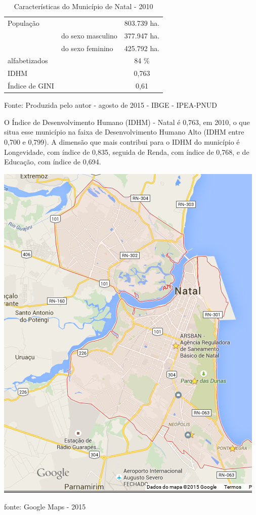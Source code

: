 \documentclass[
	12pt,				%
	openright,			%
	twoside,			%
	a4paper,			%
	chapter=TITLE,		%
	section=TITLE,		%
	subsection=TITLE,	%
	subsubsection=TITLE,%
	spanish,            %
	english,			%
	brazil				%
	]{abntex2}
\begin{document}
\begin{table}[h]
	\begin{center}
	\caption{Características do Município de Natal - 2010}%
	\label{Tabela 3}
	\begin{tabular}{llc}
		\hline		
		População & &803.739 ha. \\
		&do sexo masculino & 377.947 ha. \\
		&do sexo feminino & 425.792 ha. \\
		\hline
		alfabetizados & &84 \%\\
		IDHM & &0,763 \\
		Índice de GINI & &0,61 \\
		\hline
	\end{tabular}
	\end{center}
	\ABNTEXchapterfont\small{Fonte: Produzida pelo autor - agosto de 2015 - IBGE\cite{IBGE} - IPEA-PNUD\cite{IPEA}}%
\end{table}
\FloatBarrier
\par
O Índice de Desenvolvimento Humano (IDHM) - Natal é 0,763, em 2010, o que situa esse município na faixa de Desenvolvimento Humano Alto (IDHM entre 0,700 e 0,799). A dimensão que mais contribui para o IDHM do município é Longevidade, com índice de 0,835, seguida de Renda, com índice de 0,768, e de Educação, com índice de 0,694. 
\begin{mapa}[!htb]
	\caption{\label{Mapa2}Município de Natal - RN}
	\begin{center}
		\includegraphics[scale=0.9]{natal.png}
	\end{center}
	\ABNTEXchapterfont\small{fonte: Google Maps - 2015}
\end{mapa}
\FloatBarrier
\par
\end{document}
